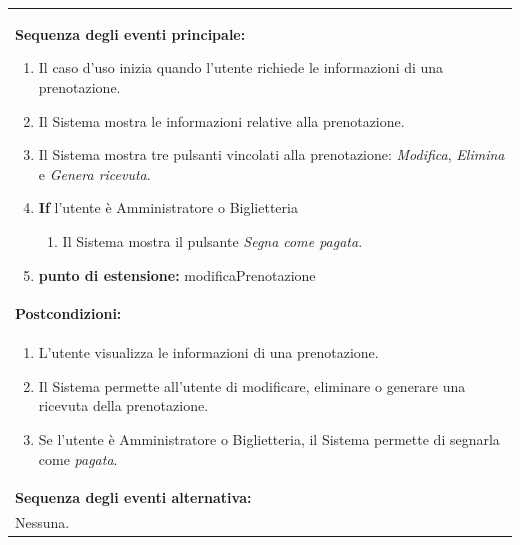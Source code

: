 \documentclass{article}
\begin{document}
\begin{table}[H]
\begin{tabular}{|p{\linewidth}|}
                        \vspace{-5pt} \\
                        \hline
                        \textbf{Sequenza degli eventi principale:}
                        \begin{enumerate}
                            \item Il caso d'uso inizia quando l'utente richiede le informazioni di una prenotazione.
                            \item Il Sistema mostra le informazioni relative alla prenotazione.
                            \item Il Sistema mostra tre pulsanti vincolati alla prenotazione: \emph{Modifica}, \emph{Elimina} e \emph{Genera ricevuta}.
                            \item \textbf{If} l'utente è Amministratore o Biglietteria
                            \begin{enumerate}
                                \item Il Sistema mostra il pulsante \emph{Segna come pagata}.
                            \end{enumerate}
                            \item[] \textbf{punto di estensione:} modificaPrenotazione
                        \end{enumerate} \\
                        \hline
                        \cellcolor{gray!20}
                        \textbf{Postcondizioni:} \\
                        \cellcolor{gray!20}
                        \begin{minipage}{\linewidth}
                            \begin{enumerate}
                                \item L'utente visualizza le informazioni di una prenotazione.
                                \item Il Sistema permette all'utente di modificare, eliminare o generare una ricevuta della prenotazione.
                                \item Se l'utente è Amministratore o Biglietteria, il Sistema permette di segnarla come \emph{pagata}.
                            \end{enumerate}
                        \end{minipage}
                        \vspace{0pt} \\
                        \hline
                        \textbf{Sequenza degli eventi alternativa:} \\
                        Nessuna. \\
                        \hline
                    \end{tabular}
                \end{table}
\end{document}
